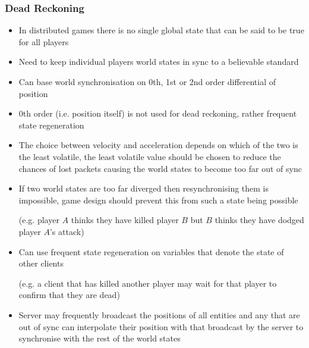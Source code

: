 \documentclass[a4paper]{article}
\begin{document}
\subsubsection{Dead Reckoning}

\begin{itemize}
  \item
    In distributed games there is no single global state that can be said to be
    true for all players

  \item
    Need to keep individual players world states in sync to a believable
    standard

  \item
    Can base world synchronisation on 0th, 1st or 2nd order differential of
    position

  \item
    0th order (i.e. position itself) is not used for dead reckoning, rather
    frequent state regeneration

  \item
    The choice between velocity and acceleration depends on which of the two is
    the least volatile, the least volatile value should be chosen to reduce the
    chances of lost packets causing the world states to become too far out of
    sync

\end{itemize}


\begin{itemize}
  \item
    If two world states are too far diverged then resynchronising them is
    impossible, game design should prevent this from such a state being possible

    (e.g. player $A$ thinks they have killed player $B$ but $B$ thinks they have
    dodged player $A$'s attack)

  \item
    Can use frequent state regeneration on variables that denote the state of
    other clients

    (e.g. a client that has killed another player may wait for that player to
    confirm that they are dead)

  \item
    Server may frequently broadcast the positions of all entities and any that
    are out of sync can interpolate their position with that broadcast by the
    server to synchronise with the rest of the world states

\end{itemize}
\end{document}
